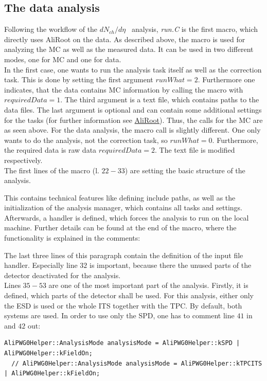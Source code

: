 \documentclass{article}
\newcommand\dNdEta{$dN_{ch}/d\eta$}
\begin{document}
\subsection{The data analysis}
\label{subsec:analysis}
Following the workflow of the \dNdEta~ analysis, \textit{run.C} is the first macro, which directly uses AliRoot on the data. As described above, the macro is used for analyzing the MC as well as the measured data. It can be used in two different modes, one for MC and one for data.\\
In the first case, one wants to run the analysis task itself as well as the correction task. This is done by setting the first argument $runWhat = 2$. Furthermore one indicates, that the data contains MC information by calling the macro with $requiredData = 1$. The third argument is a text file, which contains paths to the data files. The last argument is optional and can contain some additional settings for the tasks (for further information see \href{aliroot-docs.web.cern.ch/aliroot-docs/PWGUD_SELECTORS_DNDETA_Index.html}{AliRoot}). Thus, the calls for the MC are as seen above. For the data analysis, the macro call is slightly different. One only wants to do the analysis, not the correction task, so $runWhat = 0$. Furthermore, the required data is raw data $requiredData = 2$. The text file is modified respectively.\\
The first lines of the macro (l. $22-33$) are setting the basic structure of the analysis.

This contains technical features like defining include paths, as well as the initialization of the analysis manager, which contains all tasks and settings. Afterwards, a handler is defined, which forces the analysis to run on the local machine. Further details can be found at the end of the macro, where the functionality is explained in the comments:

The last three lines of this paragraph contain the definition of the input file handler. Especially line $32$ is important, because there the unused parts of the detector deactivated for the analysis.\\
Lines $35-53$ are one of the most important part of the analysis. Firstly, it is defined, which parts of the detector shall be used. For this analysis, either only the ESD is used or the whole ITS together with the TPC. By default, both systems are used. In order to use only the SPD, one has to comment line $41$ in and $42$ out:
\begin{lstlisting}[firstnumber=41]
  AliPWG0Helper::AnalysisMode analysisMode = AliPWG0Helper::kSPD | AliPWG0Helper::kFieldOn;
  // AliPWG0Helper::AnalysisMode analysisMode = AliPWG0Helper::kTPCITS | AliPWG0Helper::kFieldOn;
\end{lstlisting}
\end{document}
